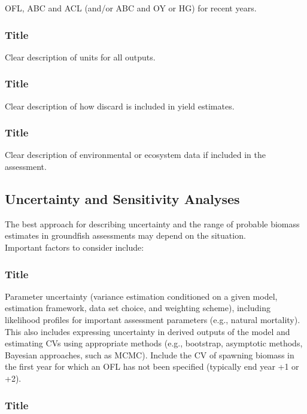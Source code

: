 \documentclass[12pt,]{article}
\begin{document}
OFL, ABC and ACL (and/or ABC and OY or HG) for recent years.

\subsubsection{Title}\label{title-29}

Clear description of units for all outputs.

\subsubsection{Title}\label{title-30}

Clear description of how discard is included in yield estimates.

\subsubsection{Title}\label{title-31}

Clear description of environmental or ecosystem data if included in the
assessment.

\subsection{Uncertainty and Sensitivity
Analyses}\label{uncertainty-and-sensitivity-analyses}

\label{sec:uncertainty} The best approach for describing uncertainty and
the range of probable biomass estimates in groundfish assessments may
depend on the situation.\\Important factors to consider include:

\subsubsection{Title}\label{title-32}

Parameter uncertainty (variance estimation conditioned on a given model,
estimation framework, data set choice, and weighting scheme), including
likelihood profiles for important assessment parameters (e.g., natural
mortality). This also includes expressing uncertainty in derived outputs
of the model and estimating CVs using appropriate methods (e.g.,
bootstrap, asymptotic methods, Bayesian approaches, such as MCMC).
Include the CV of spawning biomass in the first year for which an OFL
has not been specified (typically end year +1 or +2).

\subsubsection{Title}\label{title-33}
\end{document}
